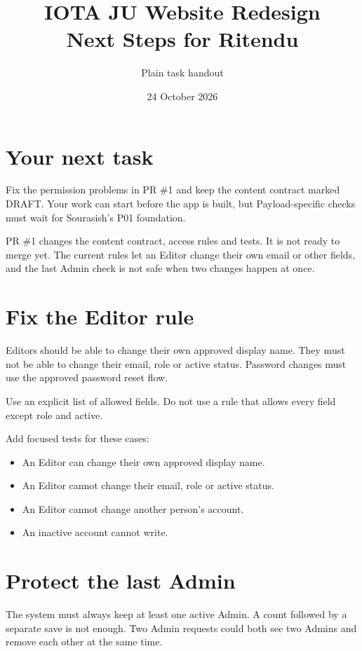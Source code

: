 \documentclass[11pt]{article}
\begin{document}
\title{IOTA JU Website Redesign\\Next Steps for Ritendu}
\author{Plain task handout}
\date{24 October 2026}
\maketitle

\section{Your next task}

Fix the permission problems in PR \#1 and keep the content contract marked DRAFT. Your work can start before the app is built, but Payload-specific checks must wait for Sourasish's P01 foundation.

PR \#1 changes the content contract, access rules and tests. It is not ready to merge yet. The current rules let an Editor change their own email or other fields, and the last Admin check is not safe when two changes happen at once.

\section{Fix the Editor rule}

Editors should be able to change their own approved display name. They must not be able to change their email, role or active status. Password changes must use the approved password reset flow.

Use an explicit list of allowed fields. Do not use a rule that allows every field except role and active.

Add focused tests for these cases:

\begin{itemize}
\item An Editor can change their own approved display name.
\item An Editor cannot change their email, role or active status.
\item An Editor cannot change another person's account.
\item An inactive account cannot write.
\end{itemize}

\section{Protect the last Admin}

The system must always keep at least one active Admin. A count followed by a separate save is not enough. Two Admin requests could both see two Admins and remove each other at the same time.
\end{document}
